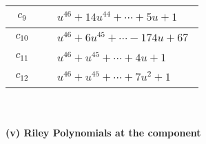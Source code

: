 \documentclass[1p]{elsarticle_modified}
\theoremstyle{definition}
\begin{document}
\begin{tabular}{m{50pt}|m{274pt}}
\hline $$\begin{aligned}c_{9}\end{aligned}$$&$\begin{aligned}
&u^{46}+14 u^{44}+\cdots+5 u+1
\end{aligned}$\\
\hline $$\begin{aligned}c_{10}\end{aligned}$$&$\begin{aligned}
&u^{46}+6 u^{45}+\cdots-174 u+67
\end{aligned}$\\
\hline $$\begin{aligned}c_{11}\end{aligned}$$&$\begin{aligned}
&u^{46}+u^{45}+\cdots+4 u+1
\end{aligned}$\\
\hline $$\begin{aligned}c_{12}\end{aligned}$$&$\begin{aligned}
&u^{46}+u^{45}+\cdots+7 u^2+1
\end{aligned}$\\
\hline
\end{tabular}\\~\\
\newpage\renewcommand{\arraystretch}{1}
\flushleft \textbf{(v) Riley Polynomials at the component}\newline \\
\end{document}
